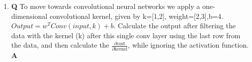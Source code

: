 \documentclass[main.tex]{subfiles}
\begin{document}
\begin{enumerate}
\begin{enumerate}
        \item \textbf{Q} To move towards convolutional neural networks we apply a one-dimensional convolutional kernel, given by k=[1,2], weight=[2,3],b=4. $Output = w^T Conv(input,k)+b$. Calculate the output after filtering the data with the kernel (k) after this single conv layer using the last row from the data, and then calculate the $\frac{\partial \text{cost}}{\partial \text{kernel}}$, while ignoring the activation function. \textbf{A}
        
        \end{enumerate}
\end{enumerate}
\end{document}
